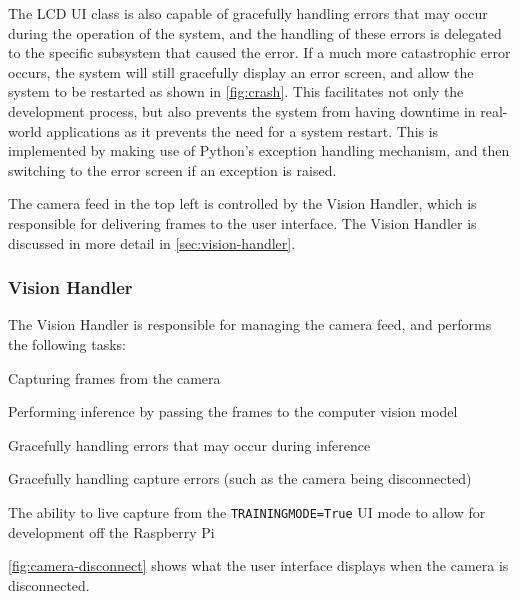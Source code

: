 The LCD UI class is also capable of gracefully handling errors that may occur during the operation of the system, and the handling of these errors is delegated to the specific subsystem that caused the error. If a much more catastrophic error occurs, the system will still gracefully display an error screen, and allow the system to be restarted as shown in \autoref{fig:crash}. This facilitates not only the development process, but also prevents the system from having downtime in real-world applications as it prevents the need for a system restart. This is implemented by making use of Python's exception handling mechanism, and then switching to the error screen if an exception is raised.

The camera feed in the top left is controlled by the Vision Handler, which is responsible for delivering frames to the user interface. The Vision Handler is discussed in more detail in \autoref{sec:vision-handler}. 

\subsubsection{Vision Handler}
\label{sec:vision-handler}
The Vision Handler is responsible for managing the camera feed, and performs the following tasks:
\begin{mylist}
    \item Capturing frames from the camera
    \item Performing inference by passing the frames to the computer vision model
    \item Gracefully handling errors that may occur during inference
    \item Gracefully handling capture errors (such as the camera being disconnected)
    \item The ability to live capture from the \texttt{TRAININGMODE=True} UI mode to allow for development off the Raspberry Pi
\end{mylist}

\autoref{fig:camera-disconnect} shows what the user interface displays when the camera is disconnected.

